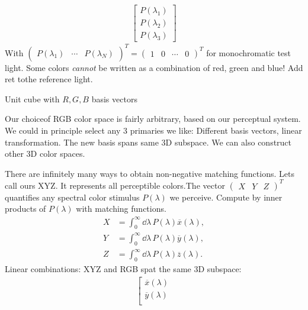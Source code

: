 \begin{compactdesc}
\begin{gather*}
	\!\left[\!\begin{smallmatrix}
		P(\lambda_1)\\
		P(\lambda_2)\\
		P(\lambda_3)
	\end{smallmatrix}\!\right]\!
\end{gather*}
With $ { \!\left(\!\begin{smallmatrix} P(\lambda_1)&\cdots&P(\lambda_N) \end{smallmatrix}\!\right)\!}^T={\!\left(\!\begin{smallmatrix} 1&0&\cdots&0 \end{smallmatrix}\!\right)\!}^T$ for monochromatic test light.
	Some colors \emph{cannot} be written as a combination of red, green and blue! Add ret tothe reference light.
\item[\lp{RGB Color Space}] Unit cube with $R,G,B$ basis vectors
\item[\lp{Other Color Spaces}] Our choiceof RGB color space is fairly arbitrary, based on our perceptual system. We could in principle select any 3 primaries we like: Different basis vectors, linear transformation. The new basis spans same 3D subspace. We can also construct other 3D color spaces.
\item[\lp{CIE XYZ Color Space}] There are infinitely many ways to obtain non-negative matching functions. Lets call ours XYZ. It represents all perceptible colors.The vector $ {\!\left(\!\begin{smallmatrix} X&Y&Z \end{smallmatrix}\!\right)\!}^T$ quantifies any spectral color stimulus $P(\lambda)$ we perceive. Compute by inner products of $P(\lambda)$ with matching functions.
	\begin{align*}
		X&={\scriptstyle\int_{0}^{\infty}}\dd{\lambda}\, P(\lambda)\overline{x}(\lambda),\\
		Y&={\scriptstyle\int_{0}^{\infty}}\dd{\lambda}\, P(\lambda)\overline{y}(\lambda),\\
		Z&={\scriptstyle\int_{0}^{\infty}}\dd{\lambda}\, P(\lambda)\overline{z}(\lambda).
	\end{align*}
	Linear combinations: XYZ and RGB spat the same 3D subspace:
	\begin{gather*}
	\!\left[\!\begin{smallmatrix}
			\overline{x}(\lambda)\\
			\overline{y}(\lambda)\\

\end{smallmatrix}
\end{gather*}
\end{compactdesc}
